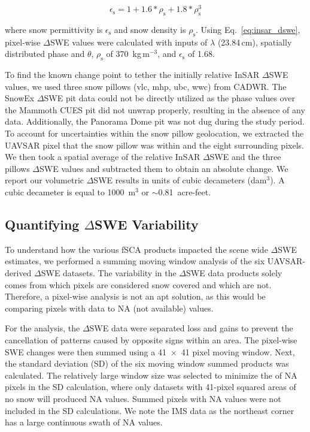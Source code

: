 \begin{equation}
\epsilon_\mathrm{s} = 1 + 1.6 * \rho_\mathrm{s} + 1.8 * \rho_\mathrm{s}^3
\label{eq:dens_to_perm}
\end{equation}


\noindent where snow permittivity is $\epsilon_\mathrm{s}$ and snow density is $\rho_\mathrm{s}$. Using Eq.~\ref{eq:insar_dswe}, pixel-wise $\Delta$SWE values were calculated with inputs of $\lambda$ (23.84\,cm), spatially distributed phase and $\theta$, $\rho_\mathrm{s}$ of 370~kg\,m$^{-3}$, and $\epsilon_\mathrm{s}$ of 1.68. 

To find the known change point to tether the initially relative InSAR $\Delta$SWE values, we used three snow pillows (vlc, mhp, ubc, wwc) from CADWR. The SnowEx $\Delta$SWE pit data could not be directly utilized as the phase values over the Mammoth CUES pit did not unwrap properly, resulting in the absence of any data. Additionally, the Panorama Dome pit was not dug during the study period. To account for uncertainties within the snow pillow geolocation, we extracted the UAVSAR pixel that the snow pillow was within and the eight surrounding pixels. We then took a spatial average of the relative InSAR $\Delta$SWE and the three pillows $\Delta$SWE values and subtracted them to obtain an absolute change. We report our volumetric $\Delta$SWE results in units of cubic decameters (dam$^{3}$). A cubic decameter is equal to 1000~m$^{3}$ or $\sim$0.81~acre-feet.

\hypertarget{ch4-methods-2}{\subsection{Quantifying $\Delta$SWE Variability}\label{ch4-methods-1}}

To understand how the various fSCA products impacted the scene wide $\Delta$SWE estimates, we performed a summing moving window analysis of the six UAVSAR-derived $\Delta$SWE datasets. The variability in the $\Delta$SWE data products solely comes from which pixels are considered snow covered and which are not. Therefore, a pixel-wise analysis is not an apt solution, as this would be comparing pixels with data to  NA (not available) values.

For the analysis, the $\Delta$SWE data were separated loss and gains to prevent the cancellation of patterns caused by opposite signs within an area. The pixel-wise SWE changes were then summed using a 41~$\times$~41 pixel moving window. Next, the standard deviation (SD) of the six moving window summed products was calculated. The relatively large window size was selected to minimize the of NA pixels in the SD calculation, where only datasets with 41-pixel squared areas of no snow will produced NA values. Summed pixels with NA values were not included in the SD calculations. We note the IMS data as the northeast corner has a large continuous swath of NA values.

